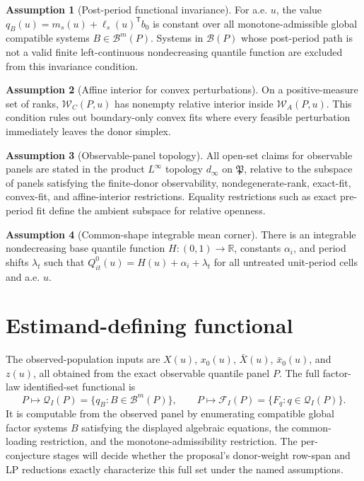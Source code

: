 \documentclass[11pt]{article}
\newcommand{\transpose}{\mathsf{T}}
\newcommand{\R}{\mathbb{R}}
\theoremstyle{definition}
\newtheorem{assumption}{Assumption}
\theoremstyle{plain}
\theoremstyle{remark}
\begin{document}
\begin{assumption}[Post-period functional invariance]\label{ass:postconstant}
For a.e. \(u\), the value \(q_B(u)=m_s(u)+\ell_s(u)^\transpose b_0\) is constant over all monotone-admissible global compatible systems \(B\in\mathcal{B}^m(P)\).  Systems in \(\mathcal{B}(P)\) whose post-period path is not a valid finite left-continuous nondecreasing quantile function are excluded from this invariance condition.
\end{assumption}

\begin{assumption}[Affine interior for convex perturbations]\label{ass:affineinterior}
On a positive-measure set of ranks, \(\mathcal{W}_C(P,u)\) has nonempty relative interior inside \(\mathcal{W}_A(P,u)\).  This condition rules out boundary-only convex fits where every feasible perturbation immediately leaves the donor simplex.
\end{assumption}

\begin{assumption}[Observable-panel topology]\label{ass:topology}
All open-set claims for observable panels are stated in the product \(L^\infty\) topology \(d_\infty\) on \(\mathfrak{P}\), relative to the subspace of panels satisfying the finite-donor observability, nondegenerate-rank, exact-fit, convex-fit, and affine-interior restrictions.  Equality restrictions such as exact pre-period fit define the ambient subspace for relative openness.
\end{assumption}

\begin{assumption}[Common-shape integrable mean corner]\label{ass:mean-shape}
There is an integrable nondecreasing base quantile function \(H:(0,1)\to\R\), constants \(\alpha_i\), and period shifts \(\lambda_t\) such that \(Q^0_{it}(u)=H(u)+\alpha_i+\lambda_t\) for all untreated unit-period cells and a.e. \(u\).
\end{assumption}

\section{Estimand-defining functional}
The observed-population inputs are \(X(u)\), \(x_0(u)\), \(\bar X(u)\), \(\bar x_0(u)\), and \(z(u)\), all obtained from the exact observable quantile panel \(P\).  The full factor-law identified-set functional is
\[
P\mapsto \mathcal{Q}_I(P)=\{q_B:B\in\mathcal{B}^m(P)\},\qquad
P\mapsto \mathcal{F}_I(P)=\{F_q:q\in\mathcal{Q}_I(P)\}.
\]
It is computable from the observed panel by enumerating compatible global factor systems \(B\) satisfying the displayed algebraic equations, the common-loading restriction, and the monotone-admissibility restriction.  The per-conjecture stages will decide whether the proposal's donor-weight row-span and LP reductions exactly characterize this full set under the named assumptions.
\end{document}
